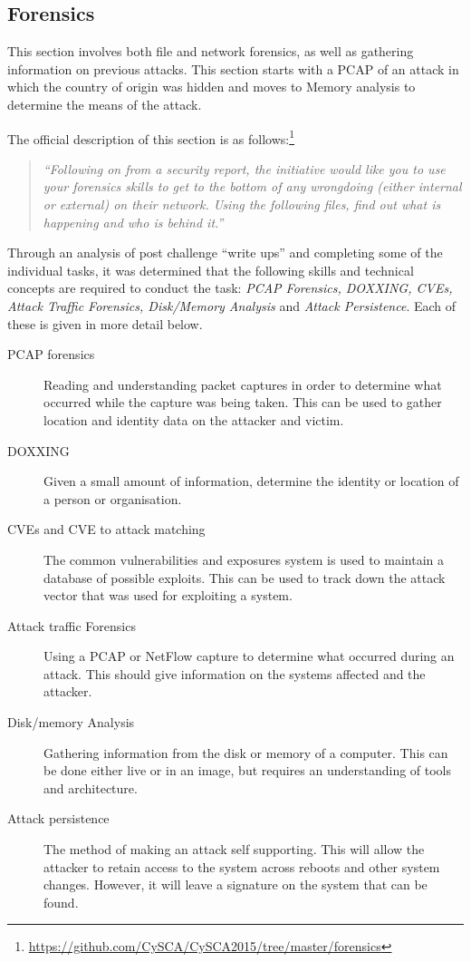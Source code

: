 \documentclass[a4paper,11pt]{report}
\begin{document}
		\subsection{Forensics}
			This section involves both file and network forensics, as well as gathering information on previous attacks. 
			This section starts with a PCAP of an attack in which the country of origin was hidden and moves to Memory analysis to determine the means of the attack. 
			
			The official description of this section is as follows:\footnote{\url{https://github.com/CySCA/CySCA2015/tree/master/forensics}}
			\begin{quote}
				\textit{``Following on from a security report, the initiative would like you to use your forensics skills to get to the bottom of any wrongdoing (either internal or external) on their network. Using the following files, find out what is happening and who is behind it.'' }
			\end{quote}
			Through an analysis of post challenge ``write ups'' and completing some of the individual tasks, 
			it was determined that the following skills and technical concepts are required to conduct the task: 
			\textit{PCAP Forensics, DOXXING, CVEs, Attack Traffic Forensics, Disk/Memory Analysis} and \textit{Attack Persistence}.
			Each of these is given in more detail below. 
			\begin{description}
				\item[PCAP forensics]
					Reading and understanding packet captures in order to determine what occurred while the capture was being taken. 
					This can be used to gather location and identity data on the attacker and victim. 
				\item[DOXXING] 
					Given a small amount of information, determine the identity or location of a person or organisation.
				\item[CVEs and CVE to attack matching]
					The common vulnerabilities and exposures system is used to maintain a database of possible exploits. 
					This can be used to track down the attack vector that was used for exploiting a system. 
				\item[Attack traffic Forensics]
					Using a PCAP or NetFlow capture to determine what occurred during an attack. 
					This should give information on the systems affected and the attacker. 
				\item[Disk/memory Analysis]
					Gathering information from the disk or memory of a computer. 
					This can be done either live or in an image, but requires an understanding of tools and architecture.
				\item[Attack persistence]
					The method of making an attack self supporting. 
					This will allow the attacker to retain access to the system across reboots and other system changes. 
					However, it will leave a signature on the system that can be found. 
			\end{description}
\end{document}
